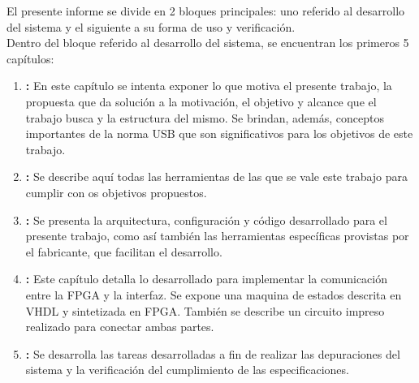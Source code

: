 El presente informe se divide en 2 bloques principales: uno referido al desarrollo del sistema y el siguiente a su forma de uso y verificación.\\

Dentro del bloque referido al desarrollo del sistema, se encuentran los primeros 5 capítulos:

\begin{enumerate}
	\item {\bf {}:} En este capítulo se intenta exponer lo que motiva el presente trabajo, la propuesta que da solución a la motivación, el objetivo y alcance que el trabajo busca y la estructura del mismo. Se brindan, además, conceptos importantes de la norma USB que son significativos para los objetivos de este trabajo.
	\item {\bf {}:} Se describe aquí todas las herramientas de las que se vale este trabajo para cumplir con os objetivos propuestos.
	\item {\bf {}:} Se presenta la arquitectura, configuración y código desarrollado para el presente trabajo, como así también las herramientas específicas provistas por el fabricante, que facilitan el desarrollo. 
	\item {\bf {}:} Este capítulo detalla lo desarrollado para implementar la comunicación entre la FPGA y la interfaz. Se expone una maquina de estados descrita en VHDL y sintetizada en FPGA. También se describe un circuito impreso realizado para conectar ambas partes.\\
	\item {\bf {}:} Se desarrolla las tareas desarrolladas a fin de realizar las depuraciones del sistema y la verificación del cumplimiento de las especificaciones.\\
\end{enumerate}